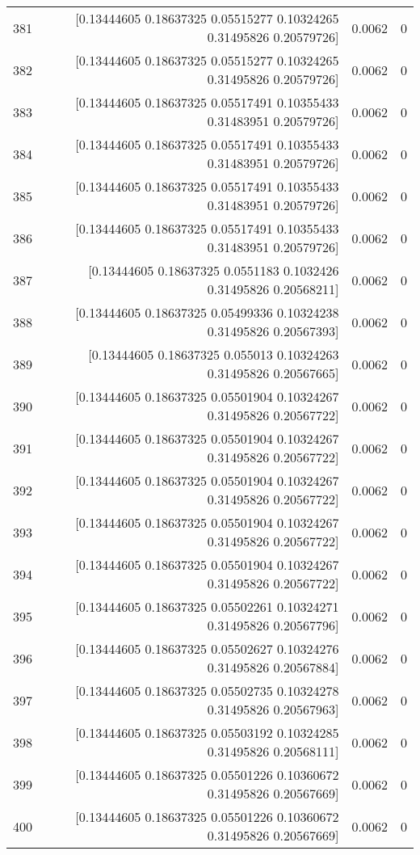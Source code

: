 \begin{longtable}{lrrr}
381 & [0.13444605 0.18637325 0.05515277 0.10324265 0.31495826 0.20579726] & 0.0062 & 0 \\
382 & [0.13444605 0.18637325 0.05515277 0.10324265 0.31495826 0.20579726] & 0.0062 & 0 \\
383 & [0.13444605 0.18637325 0.05517491 0.10355433 0.31483951 0.20579726] & 0.0062 & 0 \\
384 & [0.13444605 0.18637325 0.05517491 0.10355433 0.31483951 0.20579726] & 0.0062 & 0 \\
385 & [0.13444605 0.18637325 0.05517491 0.10355433 0.31483951 0.20579726] & 0.0062 & 0 \\
386 & [0.13444605 0.18637325 0.05517491 0.10355433 0.31483951 0.20579726] & 0.0062 & 0 \\
387 & [0.13444605 0.18637325 0.0551183  0.1032426  0.31495826 0.20568211] & 0.0062 & 0 \\
388 & [0.13444605 0.18637325 0.05499336 0.10324238 0.31495826 0.20567393] & 0.0062 & 0 \\
389 & [0.13444605 0.18637325 0.055013   0.10324263 0.31495826 0.20567665] & 0.0062 & 0 \\
390 & [0.13444605 0.18637325 0.05501904 0.10324267 0.31495826 0.20567722] & 0.0062 & 0 \\
391 & [0.13444605 0.18637325 0.05501904 0.10324267 0.31495826 0.20567722] & 0.0062 & 0 \\
392 & [0.13444605 0.18637325 0.05501904 0.10324267 0.31495826 0.20567722] & 0.0062 & 0 \\
393 & [0.13444605 0.18637325 0.05501904 0.10324267 0.31495826 0.20567722] & 0.0062 & 0 \\
394 & [0.13444605 0.18637325 0.05501904 0.10324267 0.31495826 0.20567722] & 0.0062 & 0 \\
395 & [0.13444605 0.18637325 0.05502261 0.10324271 0.31495826 0.20567796] & 0.0062 & 0 \\
396 & [0.13444605 0.18637325 0.05502627 0.10324276 0.31495826 0.20567884] & 0.0062 & 0 \\
397 & [0.13444605 0.18637325 0.05502735 0.10324278 0.31495826 0.20567963] & 0.0062 & 0 \\
398 & [0.13444605 0.18637325 0.05503192 0.10324285 0.31495826 0.20568111] & 0.0062 & 0 \\
399 & [0.13444605 0.18637325 0.05501226 0.10360672 0.31495826 0.20567669] & 0.0062 & 0 \\
400 & [0.13444605 0.18637325 0.05501226 0.10360672 0.31495826 0.20567669] & 0.0062 & 0 \\

\end{longtable}
